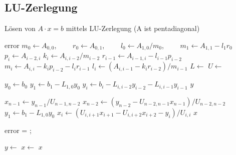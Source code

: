 \subsection{LU-Zerlegung}
\begin{Algorithmus}[H]
\caption{Lösen von $A\cdot x = b$ mittels LU-Zerlegung (A ist pentadiagonal)}
\label{alg:LU}
\begin{algorithmic}
	    \State \Return error
	\EndIf
    \State $m_0 \gets A_{0,0}$, $\qquad r_0 \gets A_{0,1}$, $\qquad l_0 \gets A_{1,0}/m_0$, $ \qquad m_1 \gets A_{1,1}- l_1r_0$
        \State $p_i \gets A_{i-2,i}$
        \State $k_i \gets A_{i,i-2}/m_{i-2}$
        \State $r_{i-1} \gets A_{i-1,i} - l_{i-1}  p_{i-2}$
        \State $m_i \gets A_{i,i} - k_i p_{i-2} - l_i  r_{i-1}$
        \State $l_i \gets (A_{i,i-1}-k_i r_{i-2})/m_{i-1}$
    \EndFor
    \State $L \gets $         
    \State $U \gets $    
    \State \Return [L, U]
\EndFunction

        \State $y_0 \gets b_0$
        \State $y_1 \gets b_1 - L_{1,0} y_0$
            \State $y_i \gets b_i - L_{i,i-2} y_{i-2} - L_{i,i-1} y_{i-1}$
        \EndFor
        \Return $y$
\EndFunction


        \State $x_{n-1} \gets y_{n-1}/U_{n-1,n-2}$
        \State $x_{n-2} \gets (y_{n-2} - U_{n-2,n-1} x_{n-1})/U_{n-2,n-2}$
        \State $y_1 \gets b_1 - L_{1,0} y_0$
            \State $x_i \gets (U_{i,i+1} x_{i+1}- U_{i,i+2} x_{i+2} - y_i) / U_{i,i}$
        \EndFor
        \Return $x$
\EndFunction




	    \State \Return error
	\EndIf
	\State [L,U] = ;

    \State $y \gets $ 
    \State $x \gets $ 
    \State \Return $x$
\EndFunction
\end{algorithmic}
\end{Algorithmus}

